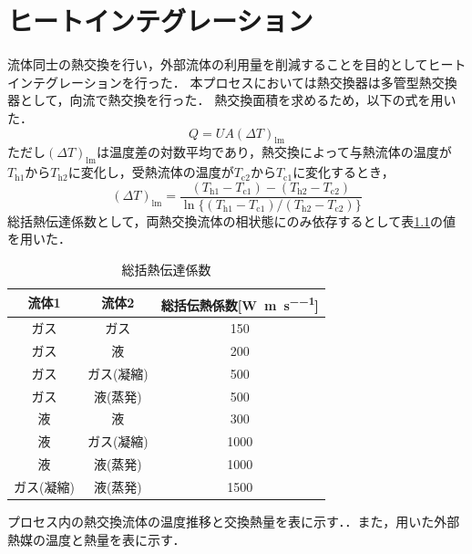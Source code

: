 \documentclass[a4j]{jsreport}
\begin{document}
\chapter{ヒートインテグレーション}
流体同士の熱交換を行い，外部流体の利用量を削減することを目的としてヒートインテグレーションを行った．
本プロセスにおいては熱交換器は多管型熱交換器として，向流で熱交換を行った．
熱交換面積を求めるため，以下の式を用いた．
\begin{equation}
    Q=UA(\varDelta T)_\mathrm{lm}
\end{equation}
ただし$(\varDelta T)_\mathrm{lm}$は温度差の対数平均であり，熱交換によって与熱流体の温度が$T_\mathrm{h1}$から$T_\mathrm{h2}$に変化し，受熱流体の温度が$T_\mathrm{c2}$から$T_\mathrm{c1}$に変化するとき，
\begin{equation}
    (\varDelta T)_\mathrm{lm} = \frac{(T_\mathrm{h1} - T_\mathrm{c1}) - (T_\mathrm{h2} - T_\mathrm{c2})}{\ln\{(T_\mathrm{h1} - T_\mathrm{c1}) / (T_\mathrm{h2} - T_\mathrm{c2})\}}
\end{equation}
総括熱伝達係数として，両熱交換流体の相状態にのみ依存するとして表\ref{総括熱伝達係数}の値を用いた．
\begin{table}[htbp]
    \caption{総括熱伝達係数}
    \label{総括熱伝達係数}
    \begin{center}
        \begin{tabular}{ccc}\hline
            流体1        &  流体2       & 総括伝熱係数[\si{\watt \per \metre \per \second}]    \\   \hline
            ガス         &  ガス        &150   \\
            ガス         &   液        &200   \\
            ガス         &  ガス(凝縮)  &500    \\
            ガス         &  液(蒸発)    &500    \\
            液           &   液          &300   \\
            液           &  ガス(凝縮)  &1000    \\
            液           &  液(蒸発)    &1000    \\
            ガス(凝縮)    &  液(蒸発)  &1500       \\\hline
        \end{tabular}
    \end{center}
\end{table}
プロセス内の熱交換流体の温度推移と交換熱量を表に示す．．また，用いた外部熱媒の温度と熱量を表に示す．
\end{document}
